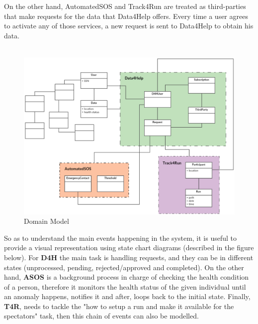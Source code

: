 \documentclass[12pt]{report}
\begin{document}
 On the other hand, AutomatedSOS and Track4Run are treated as third-parties that make requests for the data that Data4Help offers. Every time a user agrees to activate any of those services, a new request is sent to Data4Help to obtain his data. \\\\

 \begin{figure}[H]
\centering
 \includegraphics[scale=0.45]{Diagrams/domain_model.png}
\caption[Domain Model]{Domain Model}
\label{fig:Domain_model}
\end{figure}

So as to understand the main events happening in the system, it is useful to provide a visual representation using state chart diagrams (described in the figure below). For \textbf {D4H} the main task is handling requests, and they can be in different states (unprocessed, pending, rejected/approved and completed). On the other hand, \textbf {ASOS} is a background process in charge of checking the health condition of a person, therefore it monitors the health status of the given individual until an anomaly happens, notifies it and after, loops back to the initial state. Finally, \textbf {T4R}, needs to tackle the "how to setup a run and make it available for the spectators" task, then this chain of events can also be modelled.
\end{document}
